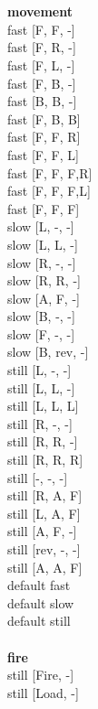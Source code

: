  
\ \\




\ \\ {\bf movement } \\
fast [F, F, -] \\
fast [F, R, -] \\
fast [F, L, -] \\
fast [F, B, -] \\
fast [B, B, -] \\
fast [F, B, B] \\
fast [F, F, R] \\
fast [F, F, L] \\
fast [F, F, F,R] \\
fast [F, F, F,L] \\
fast [F, F, F] \\
slow [L, -, -] \\
slow [L, L, -] \\
slow [R, -, -] \\
slow [R, R, -] \\
slow [A, F, -] \\
slow [B, -, -] \\
slow [F, -, -] \\
slow [B, rev, -] \\
still [L, -, -] \\
still [L, L, -] \\
still [L, L, L] \\
still [R, -, -] \\
still [R, R, -] \\
still [R, R, R] \\
still [-, -, -] \\
still [R, A, F] \\
still [L, A, F] \\
still [A, F, -] \\
still [rev, -, -] \\
still [A, A, F] \\
default fast \\
default slow \\
default still \\
\ \\ {\bf fire } \\
still [Fire, -] \\
still [Load, -] \\



